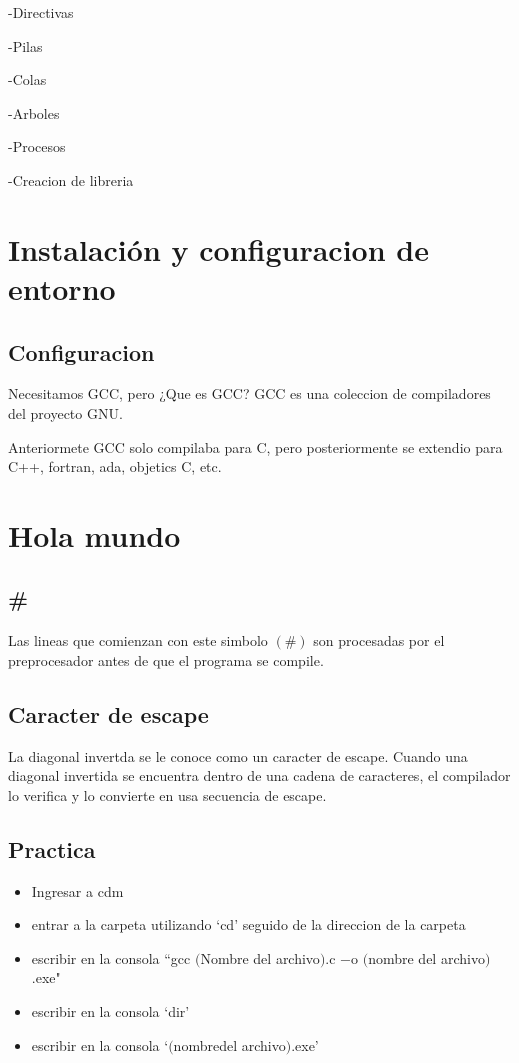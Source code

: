 \documentclass[]{article}
\begin{document}
	-Directivas
	
	-Pilas
	
	-Colas
	
	-Arboles
	
	-Procesos
	
	-Creacion de libreria
	
	\section{Instalación y configuracion de entorno}
	
	\subsection{Configuracion}
	Necesitamos GCC, pero ¿Que es GCC? GCC es una coleccion de compiladores del proyecto GNU.
	
	Anteriormete GCC solo compilaba para C, pero posteriormente se extendio para C++, fortran, ada, objetics C, etc.
	
	\section{Hola mundo}
	
	\subsection{\#}
	Las lineas que comienzan con este simbolo $\left(\#\right)$ son procesadas por el preprocesador antes de que el programa se compile.
	
	\subsection{Caracter de escape}
	La diagonal invertda se le conoce como un caracter de escape. Cuando una diagonal invertida se encuentra dentro de una cadena de caracteres, el compilador lo verifica y lo convierte en usa secuencia de escape.
	
	\subsection{Practica}
	
	\begin{itemize}
		\item Ingresar a cdm
		\item entrar a la carpeta utilizando `cd' seguido de la direccion de la carpeta
		\item escribir en la consola ``gcc $($Nombre del archivo$)$.c $-$o $($nombre del archivo$)$.exe"
		\item escribir en la consola `dir'
		\item escribir en la consola `$($nombredel archivo$)$.exe'
	\end{itemize}
	
\end{document}
